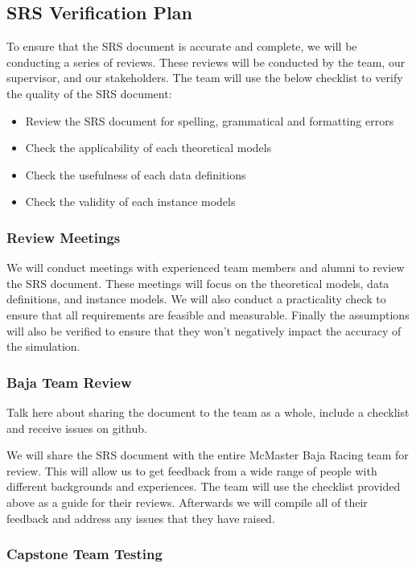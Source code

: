 \documentclass[12pt, titlepage]{article}
\begin{document}
\subsection{SRS Verification Plan}

\noindent To ensure that the SRS document is accurate and complete, we will be conducting a series of reviews.
These reviews will be conducted by the team, our supervisor, and our stakeholders.
The team will use the below checklist to verify the quality of the SRS document:
\begin{itemize}
  \item Review the SRS document for spelling, grammatical and formatting errors
  \item Check the applicability of each theoretical models
  \item Check the usefulness of each data definitions
  \item Check the validity of each instance models
\end{itemize}

\subsubsection*{Review Meetings}
We will conduct meetings with experienced team members and alumni to review the SRS document.
These meetings will focus on the theoretical models, data definitions, and instance models.
We will also conduct a practicality check to ensure that all requirements are feasible and measurable.
Finally the assumptions will also be verified to ensure that they won't negatively impact the accuracy of the simulation.

\subsubsection*{Baja Team Review}
Talk here about sharing the document to the team as a whole, include a checklist and receive issues on github.

We will share the SRS document with the entire McMaster Baja Racing team for review.
This will allow us to get feedback from a wide range of people with different backgrounds and experiences.
The team will use the checklist provided above as a guide for their reviews.
Afterwards we will compile all of their feedback and address any issues that they have raised.

\subsubsection*{Capstone Team Testing}
\end{document}
